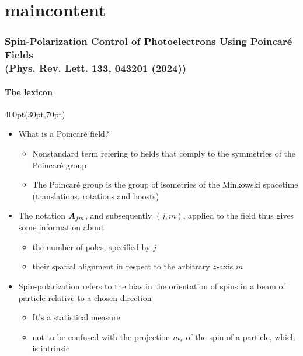 
\section{maincontent}

\begin{frame}
\frametitle{Spin-Polarization Control of Photoelectrons
Using Poincar\'e Fields \\
\small (Phys. Rev. Lett. \textbf{133}, 043201 (2024))}
\framesubtitle{The lexicon}


\footnotesize
\begin{textblock*}{400pt}(30pt,70pt)
\begin{itemize}
\item What is a Poincar\'e field?
\begin{itemize}
\footnotesize
\item[$\bullet$] Nonstandard term 
refering to fields that comply to the symmetries 
of the Poincar\'e group
\item[$\bullet$] The Poincar\'e group is the group of isometries of 
the Minkowski spacetime \\
(translations, rotations and boosts)
\end{itemize}
\item The notation ${\rm {\boldsymbol{A}}}_{jm}$, and subsequently $(j,m)$,
applied to the field thus gives some information about
\begin{itemize}
\footnotesize
\item[$\bullet$] the number of poles, specified by $j$
\item[$\bullet$] their spatial alignment in respect 
to the arbitrary $z$-axis $m$
\end{itemize}
\vspace{10pt}
\item Spin-polarization refers to the bias 
in the orientation of spins in a beam of particle 
relative to a chosen direction
\begin{itemize}
\footnotesize
\item[$\bullet$] It's a statistical measure
\item[$\bullet$] not to be confused 
with the projection $m_s$ of the spin of a particle, which is intrinsic
\end{itemize}
\end{itemize}
\end{textblock*}
 
\end{frame}


